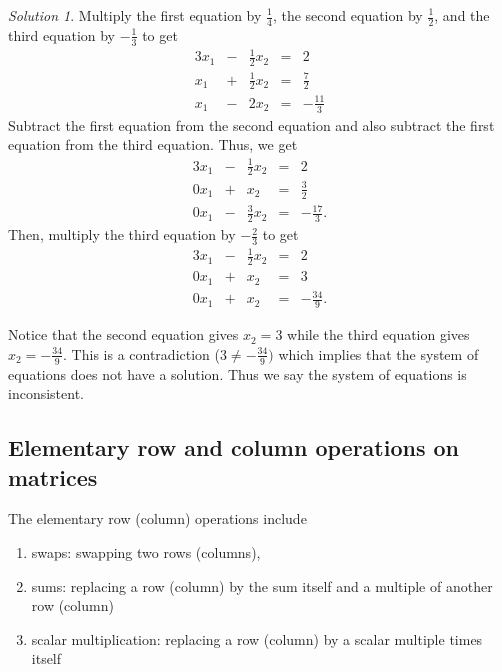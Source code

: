 \documentclass[
]{book}
\providecommand{\tightlist}{%
  \setlength{\itemsep}{0pt}\setlength{\parskip}{0pt}}
\theoremstyle{definition}
\theoremstyle{definition}
\theoremstyle{definition}
\theoremstyle{definition}
\theoremstyle{remark}
\newtheorem*{solution}{Solution}
\begin{document}
\begin{solution}
Multiply the first equation by \(\frac{1}{4}\), the second equation by \(\frac{1}{2}\), and the third equation by \(-\frac{1}{3}\) to get
\begin{alignat*}{3}
x_1 & {}-{} & \frac{1}{2} x_2 & {}={} & 2\\
x_1 & {}+{} & \frac{1}{2} x_2 & {}={} & \frac{7}{2} \\
 x_1 & {}-{} & 2 x_2 &{}={} & -\frac{11}{3}
\end{alignat*}
Subtract the first equation from the second equation and also subtract the first equation from the third equation. Thus, we get
\begin{alignat*}{3}
x_1 & {}-{} & \frac{1}{2} x_2 & {}={} & 2\\
0 x_1 & {}+{} & x_2 & {}={} & \frac{3}{2} \\
0 x_1 & {}-{} & \frac{3}{2} x_2 &{}={} & -\frac{17}{3}.
\end{alignat*}
Then, multiply the third equation by \(-\frac{2}{3}\) to get
\begin{alignat*}{3}
x_1 & {}-{} & \frac{1}{2} x_2 & {}={} & 2\\
0 x_1 & {}+{} & x_2 & {}={} & 3 \\
0 x_1 & {}+{} & x_2 &{}={} & - \frac{34}{9}.
\end{alignat*}

Notice that the second equation gives \(x_2 = 3\) while the third equation gives \(x_2 = -\frac{34}{9}\). This is a contradiction (\(3 \neq -\frac{34}{9})\) which implies that the system of equations does not have a solution. Thus we say the system of equations is inconsistent.
\end{solution}

\hypertarget{elementary-row-and-column-operations-on-matrices}{%
\subsection{Elementary row and column operations on matrices}\label{elementary-row-and-column-operations-on-matrices}}

The elementary row (column) operations include

\begin{enumerate}
\def\labelenumi{\arabic{enumi})}
\tightlist
\item
  swaps: swapping two rows (columns),
\item
  sums: replacing a row (column) by the sum itself and a multiple of another row (column)
\item
  scalar multiplication: replacing a row (column) by a scalar multiple times itself
\end{enumerate}
\end{document}
